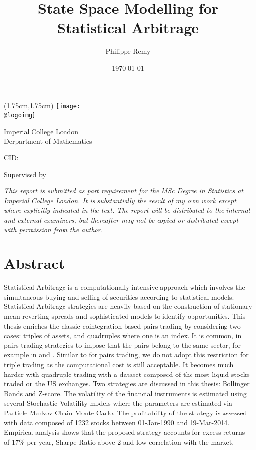 \documentclass[11pt,a4,twosided,singlespacing,titlepagenumber=on]{scrreprt}
\title{State Space Modelling for Statistical Arbitrage}
\author{Philippe Remy}
\date{\today}
\makeatletter
\numberwithin{equation}{chapter} %
\theoremstyle{remark}
\renewcommand{\maketitle}{
\begin{titlepage}
\ifdefined\@logoimg
\begin{textblock*}{8cm}(1.75cm,1.75cm)
\texttt{[image: \\@logoimg]}
\end{textblock*}
\vspace*{1cm}
\else
\fi
\begin{center}
\vspace*{\stretch{0.1}}
Imperial College London\\
Derpartment of Mathematics\par
\vspace*{\stretch{1}} %
{\titlefont\Huge \@title\par} %
\vspace*{\stretch{2}}
{\Large \@author \par}
\vspace*{1em}
{\large CID: \@CID \par}
\vspace*{\stretch{0.5}}
{\large Supervised by \@supervisor \par}
\vspace*{\stretch{3}}
\@date
\vspace*{\stretch{1}}

\end{center}%
\textit{
This report is submitted as part requirement for the MSc Degree in Statistics at Imperial College London. It is substantially the result of my own work except where explicitly indicated in the text. The report will be distributed to the internal and external examiners, but thereafter may not be copied or distributed except with permission from the author.}
\vspace*{\stretch{0.1}}
\end{titlepage}%
}
\renewenvironment{abstract}%
{\chapter*{Abstract}\thispagestyle{plain}}%
{\clearpage}
\makeatother
\begin{document}


\maketitle


\begin{abstract}
Statistical Arbitrage is a computationally-intensive approach which involves the simultaneous buying and selling of securities according to statistical models. Statistical Arbitrage strategies are heavily based on the construction of stationary mean-reverting spreads and sophisticated models to identify opportunities. This thesis enriches the classic cointegration-based pairs trading by considering two cases: triples of assets, and quadruples where one is an index. It is common, in pairs trading strategies to impose that the pairs belong to the same sector, for example in \cite{chan2009} and \cite{dunis2010}. Similar to \cite{caldeira2013} for pairs trading, we do not adopt this restriction for triple trading as the computational cost is still acceptable. It becomes much harder with quadruple trading with a dataset composed of the most liquid stocks traded on the US exchanges. Two strategies are discussed in this thesis: Bollinger Bands and Z-score. The volatility of the financial instruments is estimated using several Stochastic Volatility models where the parameters are estimated via Particle Markov Chain Monte Carlo. The profitability of the strategy is assessed with data composed of 1232 stocks between 01-Jan-1990 and 19-Mar-2014. Empirical analysis shows that the proposed strategy accounts for excess returns of 17\% per year, Sharpe Ratio above 2 and low correlation with the market.

\end{abstract}


\renewcommand{\contentsname}{Table of Contents}
\tableofcontents

\listoffigures
\listoftables



\end{document}
